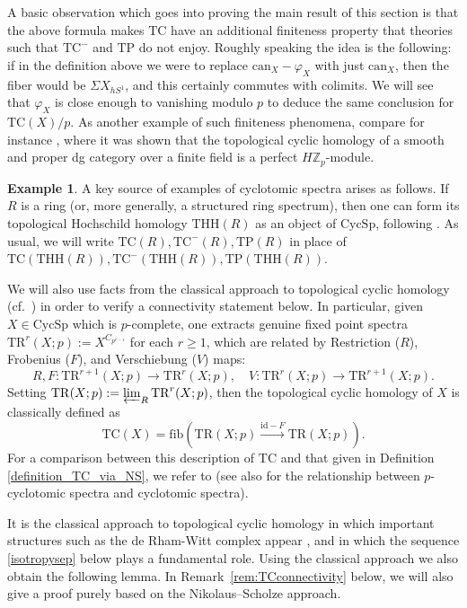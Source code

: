 \documentclass{amsart}
\newcommand{\can}{\mathrm{can}}
\newcommand{\THH}{\mathrm{THH}}
\newcommand{\TP}{\mathrm{TP}}
\theoremstyle{definition}
\newtheorem{example}[definition]{Example}
\newcommand{\TR}{\mathrm{TR}}
\newcommand{\CycSp}{\mathrm{CycSp}}
\newcommand{\TC}{\mathrm{TC}}
\begin{document}
A basic observation which goes into proving the main result of this section is
that the above formula makes $\TC$ have an additional finiteness property that
theories such that $\TC^-$ and $\TP$ do not enjoy. Roughly speaking the idea is
the following: if in the definition above we were to replace $\can_X-\varphi_X$
with just $\can_X$, then the fiber would be $\Sigma X_{hS^1}$, and this certainly commutes with colimits.  We will see that $\varphi_X$ is close enough to vanishing modulo $p$ to deduce the same conclusion for $\TC(X)/p$.  
As another example of such finiteness phenomena, 
compare for instance \cite{AMN}, where it was shown that the topological
cyclic homology  of a smooth and proper dg category over a finite field 
is a perfect $H \mathbb{Z}_p$-module. 

\begin{example} 
A key source of examples of cyclotomic spectra arises as follows. 
If $R$ is a ring (or, more generally, a structured ring spectrum), then one can form its topological Hochschild homology $\THH(R)$ as an object of $\CycSp$, following \cite[\S III.2]{nikolaus-scholze}. As usual, we will write $\TC(R), \TC^-(R), \TP(R)$ in place of $\TC(\THH(R)), \TC^-(\THH(R)), \TP(\THH(R))$.
\end{example} 


We will also use facts from the classical approach to topological cyclic
homology (cf.~\cite[\S6]{BMcyc}) in order to verify a connectivity statement below. In particular, given $X \in \CycSp$ which is $p$-complete, one extracts genuine fixed
point spectra $\TR^{r}(X;p):=X^{C_{p^{r-1}}}$ for each $r\ge1$, which are related by Restriction ($R$), Frobenius ($F$), and Verschiebung ($V$) maps:
\[ R, F: \TR^{r+1}(X;p) \to \TR^{r}(X;p) , \quad V: \TR^{r}(X;p) \to
\TR^{r+1}(X;p).\]
Setting $\TR(X;p):=\varprojlim_R\TR^r(X;p)$, then the topological cyclic
homology of $X$ is classically defined as \begin{equation}
\label{keyformulaclassical}\TC(X)=\mathrm{fib}(\TR(X;p)\xrightarrow{\mathrm{id}-F}\TR(X;p)).\end{equation}
For a comparison between this description of $\TC$ and that given in Definition
\ref{definition_TC_via_NS}, we refer to \cite[\S II.4]{nikolaus-scholze}
(see
also \cite[Rem.~II.1.3]{nikolaus-scholze} for the relationship between
$p$-cyclotomic spectra and cyclotomic spectra). 




It is the classical approach to topological cyclic homology in which important structures such as the de
Rham-Witt complex appear \cite{Hesselholt}, and in which the sequence \eqref{isotropysep} below plays a fundamental role.  Using the classical approach we also obtain the following lemma.
In Remark~\ref{rem:TCconnectivity} below, we 
will also give  a proof purely based on the Nikolaus--Scholze approach. 
\end{document}
